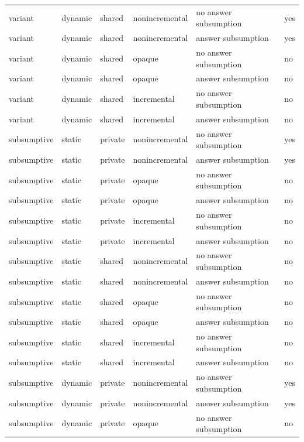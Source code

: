 \begin{table}
\begin{center}
{\begin{tabular}{llllll}
variant &	    dynamic &	   shared &	  nonincremental &      no answer subsumption &	yes \\
variant &	    dynamic &	   shared &	  nonincremental &      answer subsumption &	yes \\
variant &	    dynamic &	   shared &	  opaque &	      no answer subsumption &	no \\
variant &	    dynamic &	   shared &	  opaque &	      answer subsumption &	no \\
variant &	    dynamic &	   shared &	  incremental &         no answer subsumption &	no \\
variant &	    dynamic &	   shared &	  incremental &         answer subsumption &	no \\
subsumptive &	    static &	   private &	  nonincremental &      no answer subsumption &	yes \\
subsumptive &	    static &	   private &	  nonincremental &      answer subsumption &	yes \\
subsumptive &	    static &	   private &	  opaque &	      no answer subsumption &	no \\
subsumptive &	    static &	   private &	  opaque &	      answer subsumption &	no \\
subsumptive &	    static &	   private &	  incremental &         no answer subsumption &	no \\
subsumptive &	    static &	   private &	  incremental &         answer subsumption &	no \\
subsumptive &	    static &	   shared &	  nonincremental &      no answer subsumption &	no \\
subsumptive &	    static &	   shared &	  nonincremental &      answer subsumption &	no \\
subsumptive &	    static &	   shared &	  opaque &	      no answer subsumption &	no \\
subsumptive &	    static &	   shared &	  opaque &	      answer subsumption &	no \\
subsumptive &	    static &	   shared &	  incremental &       no answer subsumption &	no \\
subsumptive &	    static &	   shared &	  incremental &          answer subsumption &	no \\
subsumptive &	    dynamic &	   private &	  nonincremental &      no answer subsumption &	yes \\
subsumptive &	    dynamic &	   private &	  nonincremental &      answer subsumption &	yes \\
subsumptive &	    dynamic &	   private &	  opaque &	      no answer subsumption &	no \\

\end{tabular}}
\end{center}
\end{table}
